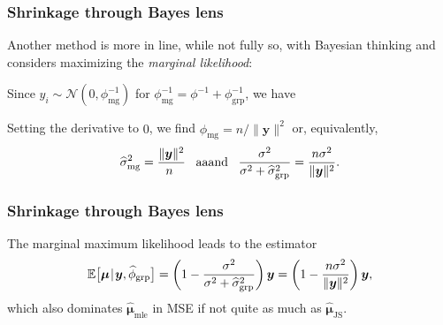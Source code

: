 \documentclass[18pt, handout]{beamer}
\newcommand{\defineTightSpacing}{%
	\setlength{\abovedisplayskip}{.25\baselineskip}%
	\setlength{\belowdisplayskip}{.25\baselineskip}%
}
\newenvironment{tightEquation*}{%
	\defineTightSpacing%
	\begin{equation*}
}{
	\end{equation*} \ignorespacesafterend
}
\newcommand{\given}{\thinnerspace | \thinnerspace}
\newcommand{\diff}{\operatorname{\mathrm{d}}\!{}}
\newcommand{\thinnerspace}{\mskip.5\thinmuskip}
\newcommand{\expectation}{\mathbb{E}}
\newcommand{\normalDist}{\mathcal{N}}
\newcommand{\mle}[1]{\widehat{#1}_{\textrm{mle}}}
\newcommand{\density}{\pi}
\newcommand{\likelihood}{L}
\newcommand{\by}{\bm{y}}
\newcommand{\bmu}{\bm{\mu}}
\begin{document}
\begin{frame}
\frametitle{Shrinkage through Bayes lens}
Another method is more in line, while not fully so, with Bayesian thinking and considers maximizing the \textit{marginal likelihood}:

Since $y_i \sim \normalDist(0, \phi_{\mathrm{mg}}^{-1})$ for $\phi_{\mathrm{mg}}^{-1} = \phi^{-1} + \phi_{\mathrm{grp}}^{-1}$, we have
\begin{tightEquation*}
\end{tightEquation*}

\smallskip
Setting the derivative to $0$, we find $\widehat{\phi}_{\mathrm{mg}} = n / \| \by \|^2$ or, equivalently,
\begin{equation*} \defineTightSpacing%
\widehat{\sigma}_{\mathrm{mg}}^2 = \frac{\| \by \|^2}{\!\!n} 
	\ \, \text{ aaand } \ \,
\frac{\sigma^2}{\sigma^2 + \widehat{\sigma}_{\mathrm{grp}}^2}
	= \frac{n \sigma^2}{\| \by \|^2}.
\end{equation*}
\end{frame}


\begin{frame}
\frametitle{Shrinkage through Bayes lens}
\vspace{1.5\baselineskip}
The marginal maximum likelihood leads to the estimator
\begin{equation*} \defineTightSpacing%
\expectation\big[
	\bmu \given \by, \widehat{\phi}_{\mathrm{grp}}
\big]
	= \left( 1 - \frac{\sigma^2}{\sigma^2 + \widehat{\sigma}^2_{\mathrm{grp}}} \right) \by
	= \left( 1 - \frac{n \sigma^2}{\| \by \|^2} \right) \by,
\end{equation*}
which also dominates $\mle{\bmu}$ in {\small MSE} if not quite as much as $\widehat{\bmu}_{\mathrm{JS}}$.
\end{frame}
\end{document}

